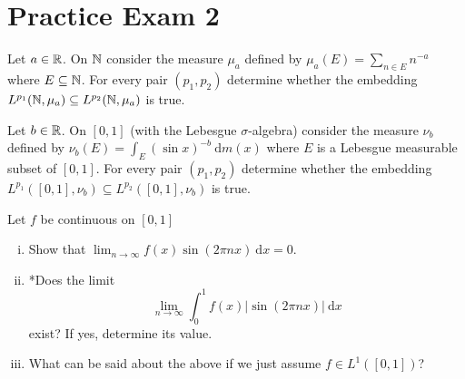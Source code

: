 

\section{Practice Exam 2}

\begin{problem}
  Let $a \in \mathbb R$. On $\mathbb N$ consider the measure $\mu_a$ 
  defined by $\mu_a(E) = \sum_{n\in E}n^{-a}$ where $E \subseteq \mathbb N$.
  For every pair $(p_1, p_2)$ determine whether the embedding 
  $L^{p_1}(\mathbb N, \mu_a) \subseteq L^{p_2}(\mathbb N, \mu_a)$ is true.
\end{problem}

\begin{problem}
  Let $b \in \mathbb R$. On $[0, 1]$ (with the Lebesgue $\sigma$-algebra) 
  consider the measure $\nu_b$ defined by $\nu_b(E) = \int_E (\sin x)^{-b} \ \mathrm{d}m(x)$
  where $E$ is a Lebesgue measurable subset of $[0, 1]$. For every pair $(p_1, p_2)$ 
  determine whether the embedding $L^{p_1}([0, 1], \nu_b) \subseteq L^{p_2}([0, 1], \nu_b)$ is true.
\end{problem}

\begin{problem}
  Let $f$ be continuous on $[0, 1]$
  \begin{enumerate}[(i)]
    \item Show that $\lim_{n\to\infty} f(x)\sin(2\pi nx) \ \mathrm{d}x = 0$.
    \item *Does the limit
    \[\lim_{n\to\infty} \int_0^1 f(x)|\sin(2 \pi nx)|\ \mathrm{d}x\]
    exist? If yes, determine its value.
    \item What can be said about the above if we just assume $f \in L^1([0, 1])$?
  \end{enumerate}
\end{problem}

